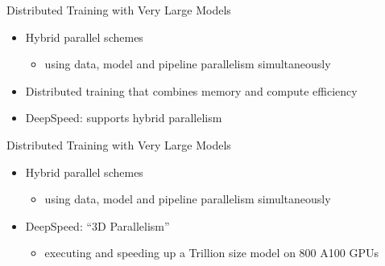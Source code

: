 \begin{frame}{Distributed Training with Very Large Models}
\protect\hypertarget{distributed-training-with-very-large-models-1}{}
\begin{itemize}
\tightlist
\item
  Hybrid parallel schemes

  \begin{itemize}
  \tightlist
  \item
    using data, model and pipeline parallelism simultaneously
  \end{itemize}
\item
  Distributed training that combines memory and compute efficiency
\item
  DeepSpeed: supports hybrid parallelism
\end{itemize}

\end{frame}

\begin{frame}{Distributed Training with Very Large Models}
\protect\hypertarget{distributed-training-with-very-large-models-2}{}
\begin{itemize}
\tightlist
\item
  Hybrid parallel schemes

  \begin{itemize}
  \tightlist
  \item
    using data, model and pipeline parallelism simultaneously
  \end{itemize}
\item
  DeepSpeed: ``3D Parallelism''

  \begin{itemize}
  \tightlist
  \item
    executing and speeding up a Trillion size model on 800 A100 GPUs
  \end{itemize}
\end{itemize}

\end{frame}


